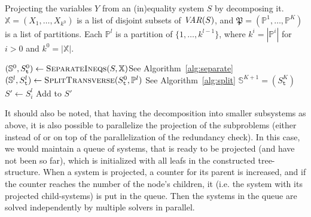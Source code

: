 \begin{algorithm}\caption{Projecting the variables $Y$ from an (in)equality system $S$ by decomposing it.
$\mathbb{X}=(X_1,\ldots, X_{k^0})$ is a list of disjoint subsets of $\mathit{VAR}(S)$, and 
$\mathfrak{P}=(\mathbb{P}^1, \ldots, \mathbb{P}^K)$ is a list of partitions. Each $\mathbb{P}^l$ is a partition of $\{1,\ldots, k^{l-1}\}$, where $k^{i}=|\mathbb{P}^i|$ for $i>0$ and $k^0 = |\mathbb{X}|$.}
\label{alg:solve}
\begin{algorithmic}[1]
	\State $(\mathbb{S}^0,S_\texttt{t}^0) \gets \Call{SeparateIneqs}{S,\mathbb{X}}$\Comment See Algorithm~\ref{alg:separate}
		\State $(\mathbb{S}^l,S^l_\texttt{t})\gets\Call{SplitTransverse}{S^0_\texttt{t},\mathbb{P}^l}$ \Comment See Algorithm~\ref{alg:split}
	\EndFor
	\State $\mathbb{S}^{K+1} =(S^K_\texttt{t})$
	\State\Return{}
\EndFunction
\State
{}
	\State \Return {} \label{line:project1}
\Else
	\State $S'\gets S^l_i$
		\State Add  to $S'$ 
	\EndFor
	\State\Return {}\label{line:project2}
\EndIf 
\EndFunction
\end{algorithmic}
\end{algorithm}
%
%
%
It should also be noted, that having the decomposition into smaller subsystems as above, it is also possible to parallelize the projection of the subproblems (either instead of or on top of the parallelization of the redundancy check). In this case, we would maintain a queue of systems, that is ready to be projected (and have not been so far), which is initialized with all leafs in the constructed tree-structure. When a system is projected, a counter for its parent is increased, and if the counter reaches the number of the node's children, it (i.e. the system with its projected child-systems) is put in the queue. Then the systems in the queue are solved independently by multiple solvers in parallel.

